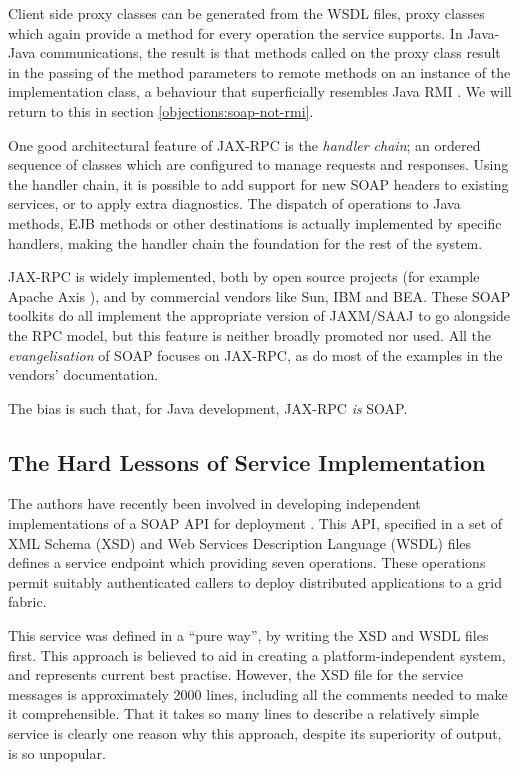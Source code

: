 Client side proxy classes can be generated from the WSDL files, proxy
classes which again provide a method for every operation the service supports. In
Java-Java communications, the result is that methods called on the
proxy class result in the passing of the method parameters to remote
methods on an instance of the implementation class, a behaviour that
superficially resembles Java RMI \cite{paper:RMI}. We will return to
this in section \ref{objections:soap-not-rmi}.

One good architectural feature of JAX-RPC is the \emph{handler chain};
an ordered sequence of classes which are configured to manage requests
and responses. Using the handler chain, it is possible to add support
for new SOAP headers to existing services, or to apply extra
diagnostics. The dispatch of operations to Java methods, EJB methods
or other destinations is actually implemented by specific handlers,
making the handler chain the foundation for the rest of the system.

JAX-RPC is widely implemented, both by open source projects (for
example Apache Axis \cite{apache:axis}), and by commercial vendors
like Sun, IBM and BEA. These SOAP toolkits do all implement the
appropriate version of JAXM/SAAJ to go alongside the RPC model, but
this feature is neither broadly promoted nor used. All the
\emph{evangelisation} of SOAP focuses on JAX-RPC, as do most of the
examples in the vendors' documentation.

The bias is such that, for Java development, JAX-RPC \emph{is} SOAP. 

\subsection{The Hard Lessons of Service Implementation}
\label{intro:experience}

The authors have recently been involved in developing independent
implementations of a SOAP API for deployment \cite{draft:CDDLM}. This
API, specified in a set of XML Schema (XSD) \cite{spec:XSD} and Web
Services Description Language (WSDL) files \cite{spec:WSDL-11} defines
a service endpoint which providing seven operations. These operations
permit suitably authenticated callers to deploy distributed
applications to a grid fabric.

This service was defined in a ``pure way'', by writing the XSD and
WSDL files first. This approach is believed to aid in creating a
platform-independent system, and represents current best
practise. However, the XSD file for the service messages is
approximately 2000 lines, including all the comments needed to make it
comprehensible. That it takes so many lines to describe a
relatively simple service is clearly one reason why this approach,
despite its superiority of output, is so unpopular.

